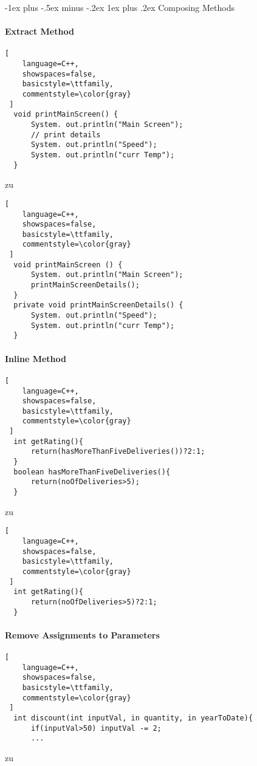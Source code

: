 \documentclass[a4paper]{article}
\makeatletter
\renewcommand{\subsubsection}{\@startsection{subsubsection}{3}{0mm}%
                                {-1ex plus -.5ex minus -.2ex}%
                                {1ex plus .2ex}%
                                {\normalfont\small\bfseries}}
\makeatother
\begin{document}
\begin{multicols}{3}
  \subsubsection{Composing Methods}
  \paragraph{Extract Method }
  
  \begin{lstlisting}[
    language=C++,
    showspaces=false,
    basicstyle=\ttfamily,
    commentstyle=\color{gray}
 ]
  void printMainScreen() {
      System. out.println("Main Screen");
      // print details
      System. out.println("Speed");
      System. out.println("curr Temp");
  }
  \end{lstlisting}
  zu
  
  \begin{lstlisting}[
    language=C++,
    showspaces=false,
    basicstyle=\ttfamily,
    commentstyle=\color{gray}
 ]
  void printMainScreen () {
      System. out.println("Main Screen");
      printMainScreenDetails();
  }
  private void printMainScreenDetails() {
      System. out.println("Speed");
      System. out.println("curr Temp");
  }
  \end{lstlisting}
  \paragraph{Inline Method }
  
  \begin{lstlisting}[
    language=C++,
    showspaces=false,
    basicstyle=\ttfamily,
    commentstyle=\color{gray}
 ]
  int getRating(){
      return(hasMoreThanFiveDeliveries())?2:1;
  }
  boolean hasMoreThanFiveDeliveries(){
      return(noOfDeliveries>5);
  }
  \end{lstlisting}
  zu
  
  \begin{lstlisting}[
    language=C++,
    showspaces=false,
    basicstyle=\ttfamily,
    commentstyle=\color{gray}
 ]
  int getRating(){
      return(noOfDeliveries>5)?2:1;
  }
  \end{lstlisting}
  
  \paragraph{Remove Assignments to Parameters}
  
  \begin{lstlisting}[
    language=C++,
    showspaces=false,
    basicstyle=\ttfamily,
    commentstyle=\color{gray}
 ]
  int discount(int inputVal, in quantity, in yearToDate){
      if(inputVal>50) inputVal -= 2;
      ...
  \end{lstlisting}
  zu
  

\end{multicols}
\end{document}
